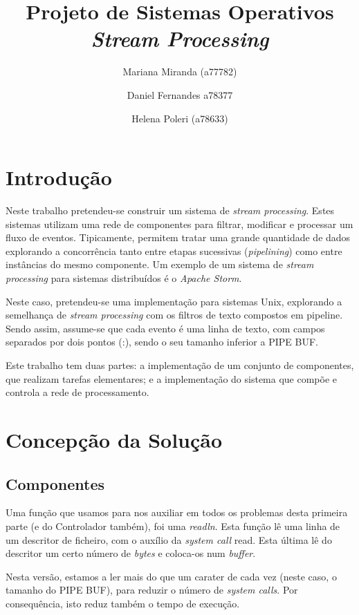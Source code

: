 \documentclass[a4paper]{article}
\title{Projeto de Sistemas Operativos\\\textit{Stream Processing}}
\author{Mariana Miranda (a77782) \and Daniel Fernandes {a78377}\and Helena Poleri (a78633)}
\begin{document}
\maketitle
\pagebreak

\section{Introdução}

Neste trabalho pretendeu-se construir um sistema de \textit{stream processing}. Estes sistemas utilizam uma rede de componentes para filtrar, modificar e processar um fluxo de eventos. Tipicamente, permitem tratar uma grande quantidade de dados explorando a concorrência tanto entre etapas sucessivas (\textit{pipelining}) como entre instâncias do mesmo componente. Um exemplo de um sistema de \textit{stream processing} para
sistemas distribuídos é o \textit{Apache Storm}.

Neste caso, pretendeu-se uma implementação para sistemas Unix, explorando a semelhança de \textit{stream processing} com os filtros de texto compostos em pipeline. Sendo assim, assume-se que cada evento é uma linha de texto, com campos separados por dois pontos (:), sendo o seu tamanho inferior a PIPE BUF.

Este trabalho tem duas partes: a implementação de um conjunto de componentes, que realizam tarefas elementares; e a implementação do sistema que compõe e controla a rede de processamento.

\section{Concepção da Solução}

\subsection{Componentes}

Uma função que usamos para nos auxiliar em todos os problemas desta primeira parte (e do Controlador também), foi uma \textit{readln}. Esta função lê uma linha de um descritor de ficheiro, com o auxílio da \textit{system call} read. Esta última lê do descritor um certo número de \textit{bytes} e coloca-os num \textit{buffer}.

Nesta versão, estamos a ler mais do que um carater de cada vez (neste caso, o tamanho do PIPE BUF), para reduzir o número de \textit{system calls}. Por consequência, isto reduz também o tempo de execução.
\end{document}
